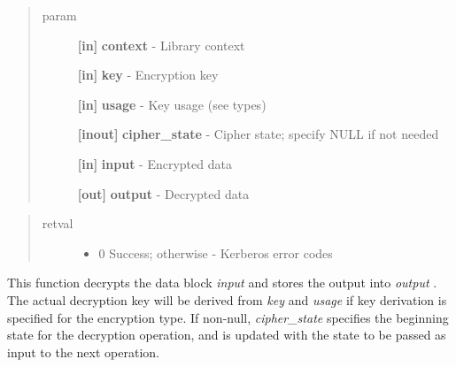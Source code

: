 \documentclass[letterpaper,10pt,english]{sphinxmanual}
\begin{document}
\begin{fulllineitems}
\label{appdev/refs/api/krb5_k_decrypt:krb5_k_decrypt}
\end{fulllineitems}

\begin{quote}\begin{description}
\item[{param}] \leavevmode
\textbf{{[}in{]}} \textbf{context} - Library context

\textbf{{[}in{]}} \textbf{key} - Encryption key

\textbf{{[}in{]}} \textbf{usage} - Key usage (see  types)

\textbf{{[}inout{]}} \textbf{cipher\_state} - Cipher state; specify NULL if not needed

\textbf{{[}in{]}} \textbf{input} - Encrypted data

\textbf{{[}out{]}} \textbf{output} - Decrypted data

\end{description}\end{quote}
\begin{quote}\begin{description}
\item[{retval}] \leavevmode\begin{itemize}
\item {} 
0   Success; otherwise - Kerberos error codes

\end{itemize}

\end{description}\end{quote}

This function decrypts the data block \emph{input} and stores the output into \emph{output} . The actual decryption key will be derived from \emph{key} and \emph{usage} if key derivation is specified for the encryption type. If non-null, \emph{cipher\_state} specifies the beginning state for the decryption operation, and is updated with the state to be passed as input to the next operation.
\end{document}
